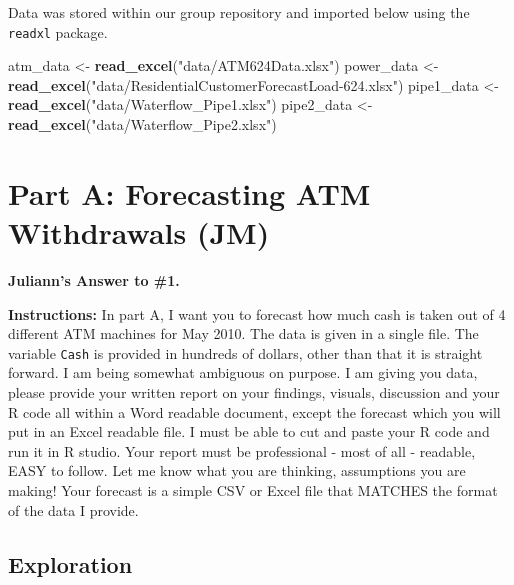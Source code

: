 \documentclass[openany]{book}
\newenvironment{Shaded}{\begin{snugshade}}{\end{snugshade}}
\newcommand{\KeywordTok}[1]{\textcolor[rgb]{0.13,0.29,0.53}{\textbf{#1}}}
\newcommand{\NormalTok}[1]{#1}
\newcommand{\StringTok}[1]{\textcolor[rgb]{0.31,0.60,0.02}{#1}}
\renewenvironment{quote}{\begin{myquote}}{\end{myquote}}
\begin{document}
Data was stored within our group repository and imported below using the \texttt{readxl} package.

\begin{Shaded}
\begin{Highlighting}[]
\NormalTok{atm_data <-}\StringTok{ }\KeywordTok{read_excel}\NormalTok{(}\StringTok{"data/ATM624Data.xlsx"}\NormalTok{) }
\NormalTok{power_data <-}\StringTok{ }\KeywordTok{read_excel}\NormalTok{(}\StringTok{"data/ResidentialCustomerForecastLoad-624.xlsx"}\NormalTok{) }
\NormalTok{pipe1_data <-}\StringTok{ }\KeywordTok{read_excel}\NormalTok{(}\StringTok{"data/Waterflow_Pipe1.xlsx"}\NormalTok{)}
\NormalTok{pipe2_data <-}\StringTok{ }\KeywordTok{read_excel}\NormalTok{(}\StringTok{"data/Waterflow_Pipe2.xlsx"}\NormalTok{)}
\end{Highlighting}
\end{Shaded}

\hypertarget{part-a}{%
\chapter*{Part A: Forecasting ATM Withdrawals (JM)}\label{part-a}}

\textbf{Juliann's Answer to \#1.}

\begin{quote}
\textbf{Instructions:} In part A, I want you to forecast how much cash is taken out of 4 different ATM machines for May 2010. The data is given in a single file. The variable \texttt{Cash} is provided in hundreds of dollars, other than that it is straight forward. I am being somewhat ambiguous on purpose. I am giving you data, please provide your written report on your findings, visuals, discussion and your R code all within a Word readable document, except the forecast which you will put in an Excel readable file. I must be able to cut and paste your R code and run it in R studio. Your report must be professional - most of all - readable, EASY to follow. Let me know what you are thinking, assumptions you are making! Your forecast is a simple CSV or Excel file that MATCHES the format of the data I provide.
\end{quote}

\hypertarget{a-exploration}{%
\section*{Exploration}\label{a-exploration}}
\end{document}
